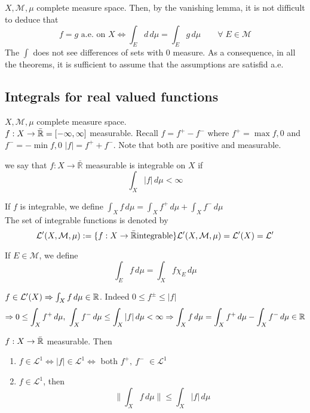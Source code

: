 \begin{remark}
    \(X, \mathcal{M}, \mu\) complete measure space. Then, by the vanishing lemma, it is not difficult to deduce that 
    \[
        f=g \text{ a.e. on } X \iff \int_E d \, d\mu = \int_E g \, d\mu \qquad \forall\; E \in \mathcal{M}
    \]
    The \(\int\) does not see differences of sets with 0 measure. As a consequence, in all the theorems, it is sufficient to assume that the assumptions are satisfid a.e. 
\end{remark}


\subsection*{Integrals for real valued functions}
\(X, \mathcal{M}, \mu\) complete measure space. \\
\(f: X \to \bar{\mathbb{R}} = [-\infty, \infty]\) measurable. Recall \(f= f^+ - f^- \) where \(f^+ = \max{f, 0}\) and \(f^- = -\min{f, 0}\) \(|f|= f^+ + f^-\). 
Note that both are positive and measurable. 

\begin{definition}
    we say that \(f:X \to \bar{\mathbb{R}}\) measurable is integrable on \(X\) if 
    \[
        \int_X |f| \, d\mu < \infty
    \]
\end{definition}

If \(f\) is integrable, we define \(\int_X f \, d\mu = \int_X f^+ \, d\mu + \int_X f^- \, d\mu\) \\
The set of integrable functions is denoted by 
\[
    \mathcal{L}' (X, \mathcal{M}, \mu) := \{f:X \to \bar{\mathbb{R}} \text{integrable} \} \\
    \mathcal{L}' (X, \mathcal{M}, \mu) = \mathcal{L}' (X) = \mathcal{L}' 
\]

If \(E \in \mathcal{M}\), we define
\[
    \int_E f \, d\mu = \int_X f \chi_E \, d\mu
\]

\begin{remark}
    \(f \in \mathcal{L}'(X) \Rightarrow \int_X f \, d\mu \in \mathbb{R}\). Indeed \(0 \leq f^\pm \leq |f|\)
    \[
        \Rightarrow 0 \leq \int_X f^+ \, d\mu ,\ \int_X f^- \, d\mu \leq \int_X |f| \, d\mu < \infty \\
        \Rightarrow \int_X f \, d\mu = \int_X f^+ \, d\mu - \int_X f^- \, d\mu \in \real
    \]
\end{remark}

\begin{proposition}
    \(f : X \to \bar{\mathbb{R}} \) measurable. Then
    \begin{enumerate}
        \item \(f \in \mathcal{L}^1 \iff |f| \in \mathcal{L}^1 \iff \) both \(f^+, \ f^-\) \(\in \mathcal{L}^1\)
        \item \(f \in \mathcal{L}^1 \), then 
        \[
            \| \int_X f \, d\mu \| \leq \int_X |f| \, d\mu  \tag{ triangle inequality}
        \]
    \end{enumerate}
\end{proposition}

